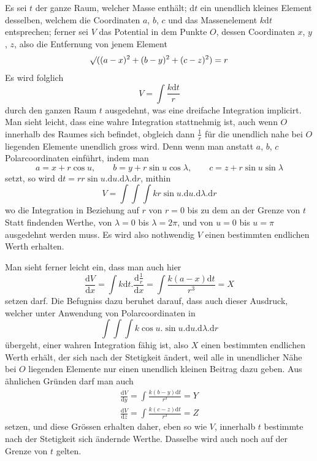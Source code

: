 Es sei $t$ der ganze Raum, welcher Masse enthält; $\mathrm{d}t$ ein unendlich kleines Element desselben, welchem die Coordinaten $a$, $b$, $c$ und das Massenelement $k\mathrm{d}t$ entsprechen; ferner sei $V$ das Potential in dem Punkte $O$, dessen Coordinaten $x$, $y$, $z$, also die Entfernung von jenem Element
\[
\mathord{{}^{}\!\surd}((a-x)^2+(b-y)^2+(c-z)^2)=r
\]
Es wird folglich
\[
V=\int\frac{k\mathrm{d}t}{r}
\]
durch den ganzen Raum $t$ ausgedehnt, was eine dreifache Integration implicirt. Man sieht leicht, dass eine wahre Integration stattnehmig ist, auch wenn $O$ innerhalb des Raumes sich befindet, obgleich dann $\frac{1}{r}$ für die unendlich nahe bei $O$ liegenden Elemente unendlich gross wird. Denn wenn man anstatt $a$, $b$, $c$ Polarcoordinaten einführt, indem man
\[
a=x+r\cos u,\qquad b=y+r\sin u\cos\lambda,\qquad c=z+r\sin u\sin\lambda
\]
setzt, so wird $\mathrm{d}t=rr\sin u.\mathrm{d}u.\mathrm{d}\lambda.\mathrm{d}r$, mithin
\[
V=\int\!\int\!\int kr\sin u.\mathrm{d}u.\mathrm{d}\lambda.\mathrm{d}r
\]
wo die Integration in Beziehung auf $r$ von $r=0$ bis zu dem an der Grenze von $t$ Statt findenden Werthe, von $\lambda=0$ bis $\lambda=2\pi$, und von $u=0$ bis $u=\pi$ ausgedehnt werden muss. Es wird also nothwendig $V$ einen bestimmten endlichen Werth erhalten.

Man sieht ferner leicht ein, dass man auch hier
\[
\frac{\mathrm{d}V}{\mathrm{d}x}=\int k\mathrm{d}t.\frac{\mathrm{d}\frac{1}{r}}{\mathrm{d}x}=\int\frac{k(a-x)\mathrm{d}t}{r^3}=X
\]
setzen darf. Die Befugniss dazu beruhet darauf, dass auch dieser Ausdruck, welcher unter Anwendung von Polarcoordinaten in
\[
\int\!\int\!\int k\cos u.\sin u.\mathrm{d}u.\mathrm{d}\lambda.\mathrm{d}r
\]
übergeht, einer wahren Integration fähig ist, also $X$ einen bestimmten endlichen Werth erhält, der sich nach der Stetigkeit ändert, weil alle in unendlicher Nähe bei $O$ liegenden Elemente nur einen unendlich kleinen Beitrag dazu geben. Aus ähnlichen Gründen darf man auch
\[
\begin{array}{l}
\displaystyle\frac{\mathrm{d}V}{\mathrm{d}y}=\int\frac{k(b-y)\mathrm{d}t}{r^3}=Y\\[6pt]
\displaystyle\frac{\mathrm{d}V}{\mathrm{d}z}=\int\frac{k(c-z)\mathrm{d}t}{r^3}=Z
\end{array}
\]
setzen, und diese Grössen erhalten daher, eben so wie $V$, innerhalb $t$ bestimmte nach der Stetigkeit sich ändernde Werthe. Dasselbe wird auch noch auf der Grenze von $t$ gelten.

